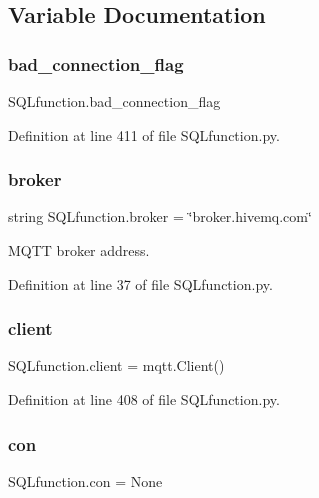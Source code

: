 \subsection{Variable Documentation}
\mbox{\label{namespace_s_q_lfunction_abffdbb58f2363e73ea86ddc83a3893ad}} 
\subsubsection{bad\+\_\+connection\+\_\+flag}
{\footnotesize\ttfamily S\+Q\+Lfunction.\+bad\+\_\+connection\+\_\+flag}



Definition at line 411 of file S\+Q\+Lfunction.\+py.

\mbox{\label{namespace_s_q_lfunction_aed5ec64d305ca004c4fe54d51dd36a4e}} 
\subsubsection{broker}
{\footnotesize\ttfamily string S\+Q\+Lfunction.\+broker = \char`\"{}broker.\+hivemq.\+com\char`\"{}}



M\+Q\+TT broker address. 



Definition at line 37 of file S\+Q\+Lfunction.\+py.

\mbox{\label{namespace_s_q_lfunction_ac9fb782d6f6dcc44fd19ea1b135ab996}} 
\subsubsection{client}
{\footnotesize\ttfamily S\+Q\+Lfunction.\+client = mqtt.\+Client()}



Definition at line 408 of file S\+Q\+Lfunction.\+py.

\mbox{\label{namespace_s_q_lfunction_a02e42e3457dfb29a0ee1b6252484b0e7}} 
\subsubsection{con}
{\footnotesize\ttfamily S\+Q\+Lfunction.\+con = None}



